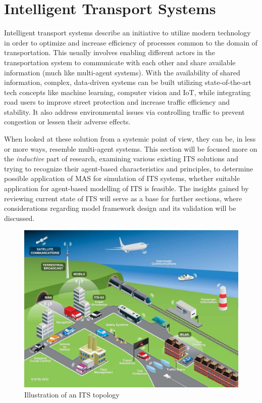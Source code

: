 \documentclass[main.tex]{subfiles}
\begin{document}
\section{Intelligent Transport Systems}\label{sec-its}

Intelligent transport systems describe an initiative to utilize modern technology 
in order to optimize and increase efficiency of processes common to the domain of transportation. 
This usually involves enabling different actors in the transportation system to communicate 
with each other and share available information (much like multi-agent systems). With the 
availability of shared information, complex, data-driven systems can be built utilizing 
state-of-the-art tech concepts like machine learning, computer vision and IoT, while
integrating road users to improve street protection and increase traffic efficiency and stability.
It also address environmental issues via controlling traffic to prevent congestion or lessen
their adverse effects. 

When looked at these solution from a systemic point of view, they can 
be, in less or more ways, resemble multi-agent systems. This section will be focused more on 
the \emph{inductive} part of research, examining various existing ITS solutions and trying 
to recognize their agent-based characteristics and principles, to determine possible application 
of MAS for simulation of ITS systems, whether suitable application for agent-based modelling of 
ITS is feasible. The insights gained by reviewing current state of ITS will 
serve as a base for further sections, where considerations regarding model framework design and 
its validation will be discussed. 

\begin{figure}[htbp]
    \centering
    \includegraphics[width=.8\textwidth]{ITS-schema.jpg}
    \caption{Illustration of an ITS topology \cite{ETSI}}
    \label{its-map}
\end{figure}
\end{document}
